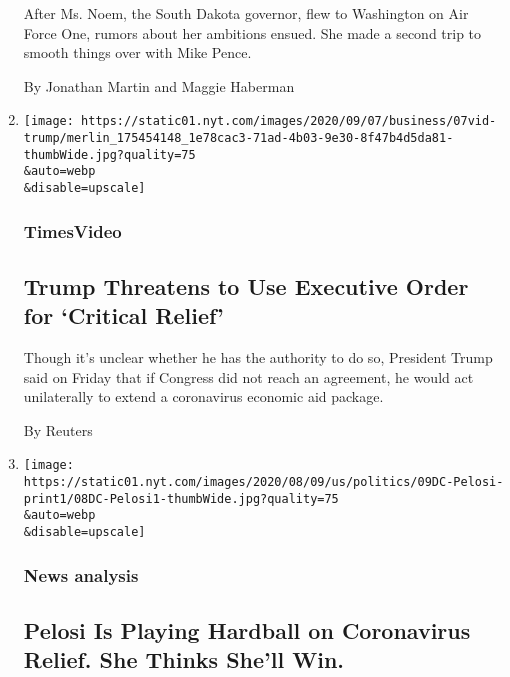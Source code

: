 \begin{enumerate}
  After Ms. Noem, the South Dakota governor, flew to Washington on Air
  Force One, rumors about her ambitions ensued. She made a second trip
  to smooth things over with Mike Pence.

  By Jonathan Martin and Maggie Haberman
\item
  \href{/video/us/politics/100000007279339/trump-says-he-will-act-on-his-own-if-congress-doesnt-agree-on-relief.html}{}

  \texttt{[image: https://static01.nyt.com/images/2020/09/07/business/07vid-trump/merlin\_175454148\_1e78cac3-71ad-4b03-9e30-8f47b4d5da81-thumbWide.jpg?quality=75\\\&auto=webp\\\&disable=upscale]}

  \hypertarget{timesvideo-1}{%
  \subsubsection{TimesVideo}\label{timesvideo-1}}

  \hypertarget{trump-threatens-to-use-executive-order-for-critical-relief}{%
  \subsection{Trump Threatens to Use Executive Order for `Critical
  Relief'}\label{trump-threatens-to-use-executive-order-for-critical-relief}}

  Though it's unclear whether he has the authority to do so, President
  Trump said on Friday that if Congress did not reach an agreement, he
  would act unilaterally to extend a coronavirus economic aid package.

  By Reuters
\item
  \href{/2020/08/08/us/politics/nancy-pelosi-coronavirus-relief.html}{}

  \texttt{[image: https://static01.nyt.com/images/2020/08/09/us/politics/09DC-Pelosi-print1/08DC-Pelosi1-thumbWide.jpg?quality=75\\\&auto=webp\\\&disable=upscale]}

  \hypertarget{news-analysis}{%
  \subsubsection{News analysis}\label{news-analysis}}

  \hypertarget{pelosi-is-playing-hardball-on-coronavirus-relief-she-thinks-shell-win}{%
  \subsection{Pelosi Is Playing Hardball on Coronavirus Relief. She
  Thinks She'll
  Win.}\label{pelosi-is-playing-hardball-on-coronavirus-relief-she-thinks-shell-win}}


\end{enumerate}

